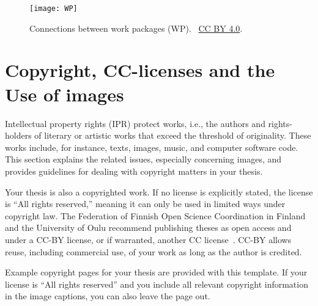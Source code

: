 \begin{figure}[ht]
  \begin{center}
    \texttt{[image: WP]}
  \end{center}
  \caption{Connections between work packages (WP). \copyrightstring\ \href{https://creativecommons.org/licenses/by/4.0/}{CC BY 4.0}.}
  \label{fig:work_packages}
\end{figure}

\section{Copyright, CC-licenses and the Use of images}
\label{copyright}
Intellectual property rights (IPR) protect works, i.e., the authors
and rights-holders of literary or artistic works that exceed the
threshold of originality. These works include, for instance, texts,
images, music, and computer software code. This section explains the
related issues, especially concerning images, and provides guidelines
for dealing with copyright matters in your thesis.

Your thesis is also a copyrighted work. If no license is explicitly
stated, the license is \enquote{All rights reserved,} meaning it can only be
used in limited ways under copyright law. The Federation of Finnish
Open Science Coordination in Finland and the University of Oulu
recommend publishing theses as open access and under a CC-BY license,
or if warranted, another CC license~\cite{coordination_open_2024}.
CC-BY allows reuse, including commercial use, of your work as long as
the author is credited.

Example copyright pages for your thesis are provided 
with this template. If your license is \enquote{All rights reserved} and
you include all relevant copyright information in the image captions, you can also leave the page out.


